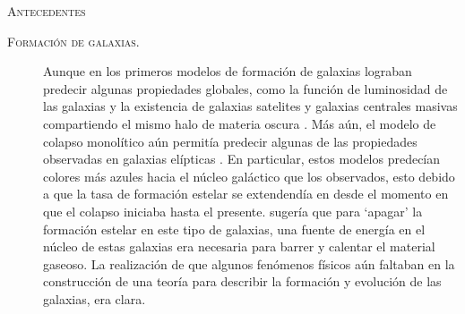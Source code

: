 \documentclass[xcolor=dvipsnames,4pt,hyperref={colorlinks,citecolor=black,linkcolor=black,urlcolor=black}]{beamer}
\begin{document}
\begin{frame}[allowframebreaks]{\textsc{Antecedentes}}
%
\begin{description}
%
\item[\textsc{Formación de galaxias.}] Aunque en los primeros modelos de formación de galaxias
lograban predecir algunas propiedades globales, como la función de luminosidad de las galaxias y la
existencia de galaxias satelites y galaxias centrales masivas compartiendo el mismo halo de materia
oscura \citep{White1978}. Más aún, el modelo de colapso monolítico aún permitía predecir algunas de
las propiedades observadas en galaxias elípticas \citep{Larson1974a, Larson1974c}. En particular,
estos modelos predecían colores más azules hacia el núcleo galáctico que los observados, esto debido
a que la tasa de formación estelar se extendendía en desde el momento en que el colapso iniciaba
hasta el presente. \citet{Larson1974c} sugería que para `apagar' la formación estelar en este tipo
de galaxias, una fuente de energía en el núcleo de estas galaxias era necesaria para barrer y
calentar el material gaseoso. La realización de que algunos fenómenos físicos aún faltaban en la
construcción de una teoría para describir la formación y evolución de las galaxias, era clara.


\end{description}
\end{frame}
\end{document}
